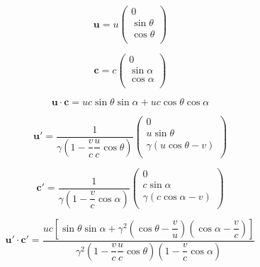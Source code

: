 \begin{equation}
	\mathbf{u} = u
	\begin{pmatrix}
		0          \\
		\sin\theta \\
		\cos\theta \\
	\end{pmatrix}
\end{equation}

\begin{equation}
	\mathbf{c} = c
	\begin{pmatrix}
		0          \\
		\sin\alpha \\
		\cos\alpha \\
	\end{pmatrix}
\end{equation}

\begin{equation}
	\mathbf{u} \cdot \mathbf{c} = uc  \sin\theta\sin\alpha + uc \cos\theta\cos\alpha
\end{equation}

\begin{equation}
	\mathbf{u}' = \dfrac{1}{\gamma \left(1-\dfrac{v}{c}\dfrac{u}{c}\cos\theta \right)}
	\begin{pmatrix}
		0                         \\
		u \sin\theta              \\
		\gamma (u \cos\theta - v) \\
	\end{pmatrix}
\end{equation}

\begin{equation}
	\mathbf{c}' = \dfrac{1}{\gamma \left(1-\dfrac{v}{c}\cos\alpha \right)}
	\begin{pmatrix}
		0                        \\
		c \sin\alpha             \\
		\gamma (c\cos\alpha - v) \\
	\end{pmatrix}
\end{equation}

\begin{equation}
	\mathbf{u}' \cdot \mathbf{c}' = \dfrac{ uc \left[ \sin\theta\sin\alpha + \gamma^2\left(\cos\theta - \dfrac{v}{u}\right)\left( \cos\alpha - \dfrac{v}{c} \right) \right]}{ \gamma^2 \left(1-\dfrac{v}{c}\dfrac{u}{c}\cos\theta \right) \left(1-\dfrac{v}{c}\cos\alpha \right)}
\end{equation}

